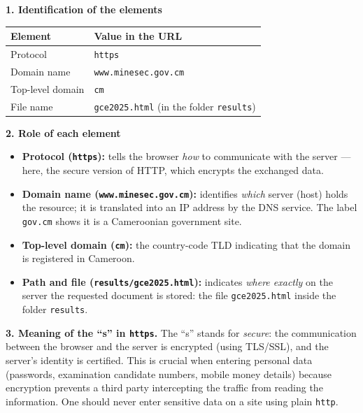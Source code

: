 \documentclass[11pt]{article}
\newcommand{\cle}[1]{{\popxbold\color{popdark}#1}}
\begin{document}
\begin{corrige}
\textbf{1. Identification of the elements}
\begin{center}
\begin{tabularx}{\linewidth}{|l|X|}\hline
\rowcolor{popblueL} \textbf{Element} & \textbf{Value in the URL} \\ \hline
Protocol & \texttt{https} \\ \hline
Domain name & \texttt{www.minesec.gov.cm} \\ \hline
Top-level domain & \texttt{cm} \\ \hline
File name & \texttt{gce2025.html} (in the folder \texttt{results}) \\ \hline
\end{tabularx}
\end{center}

\textbf{2. Role of each element}
\begin{itemize}
\item \textbf{Protocol (\texttt{https}):} tells the browser \emph{how} to communicate with the server — here, the secure version of HTTP, which encrypts the exchanged data.
\item \textbf{Domain name (\texttt{www.minesec.gov.cm}):} identifies \emph{which} server (host) holds the resource; it is translated into an IP address by the DNS service. The label \texttt{gov.cm} shows it is a Cameroonian government site.
\item \textbf{Top-level domain (\texttt{cm}):} the country-code TLD indicating that the domain is registered in Cameroon.
\item \textbf{Path and file (\texttt{results/gce2025.html}):} indicates \emph{where exactly} on the server the requested document is stored: the file \texttt{gce2025.html} inside the folder \texttt{results}.
\end{itemize}

\textbf{3. Meaning of the ``s'' in \texttt{https}.} The ``s'' stands for \emph{secure}: the communication between the browser and the server is \cle{encrypted} (using TLS/SSL), and the server's identity is certified. This is crucial when entering personal data (passwords, examination candidate numbers, mobile money details) because encryption prevents a third party intercepting the traffic from reading the information. One should never enter sensitive data on a site using plain \texttt{http}.
\end{corrige}
\end{document}
